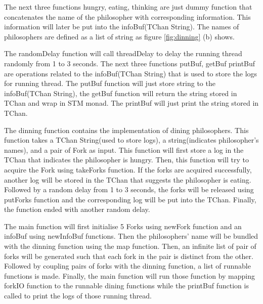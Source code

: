 \documentclass{article}
\begin{document}
\begin{normalsize}
  The next three functions hungry, eating, thinking are just dummy function that concatenates the name of the philosopher with corresponding information. This information will later be put into the infoBuf(TChan String). The names of philosophers are defined as a list of string as figure \ref{fig:dinning} (b)
  shows.

  The randomDelay function will call threadDelay to delay the running thread randomly from 1 to 3 seconds. The next three functions putBuf, getBuf printBuf are operations related to the infoBuf(TChan String) that is used to store the logs for running thread. The putBuf function will just store string to the infoBuf(TChan String), the getBuf function will return the string stored in TChan and wrap in STM monad. The printBuf will just print the string stored in TChan.

  The dinning function contains the implementation of dining philosophers. This function takes a TChan String(used to store logs), a string(indicates philosopher's names), and a pair of Fork as input. This function will first store a log in the TChan that indicates the philosopher is hungry. Then, this function will try to acquire the Fork using takeForks function. If the forks are acquired successfully, another log will be stored in the TChan that suggests the philosopher is eating. Followed by a random delay from 1 to 3 seconds, the forks will be released using putForks function and the corresponding log will be put into the TChan. Finally, the function ended with another random delay.

  The main function will first initialise 5 Forks using newFork function and an infoBuf using newInfoBuf functions. Then the philosophers' name will be bundled with the dinning function using the map function. Then, an infinite list of pair of forks will be generated such that each fork in the pair is distinct from the other. Followed by coupling pairs of forks with the dinning function, a list of runnable functions is made. Finally, the main function will run those function by mapping forkIO function to the runnable dining functions while the printBuf function is called to print the logs of those running thread.

   \begin{figure}[H]


\end{figure}
\end{normalsize}
\end{document}
